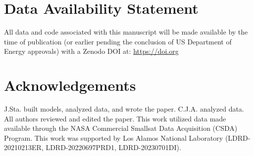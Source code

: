 \documentclass{article}
\begin{document}
\section{Data Availability Statement}

All data and code associated with this manuscript will be made available by the time of publication (or earlier pending the conclusion of US Department of Energy approvals) with a Zenodo DOI at: \href{https://doi.org}{https://doi.org}

\section{Acknowledgements}

J.Sta. built models, analyzed data, and wrote the paper. C.J.A. analyzed data. All authors reviewed and edited the paper. This work utilized data made available through the NASA Commercial Smallsat Data Acquisition (CSDA) Program. This work was supported by Los Alamos National Laboratory (LDRD-20210213ER, LDRD-20220697PRD1, LDRD-20230701DI).



\end{document}
